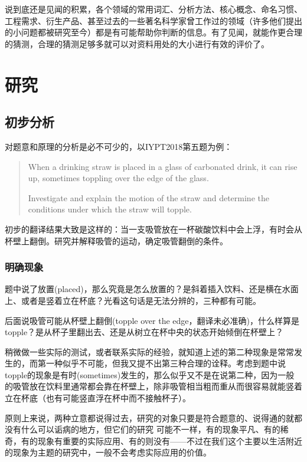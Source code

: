 \documentclass[a4paper,10pt,english]{sphinxmanual}
\begin{document}
说到底还是见闻的积累，各个领域的常用词汇、分析方法、核心概念、命名习惯、工程需求、衍生产品、甚至过去的一些著名科学家曾工作过的领域（许多他们提出的小问题都被研究至今）都是有可能帮助你判断的信息。有了见闻，就能作更合理的猜测，合理的猜测足够多就可以对资料用处的大小进行有效的评价了。


\chapter{研究}
\label{\detokenize{5. Research:id1}}\label{\detokenize{5. Research::doc}}

\section{初步分析}
\label{\detokenize{5. Research:id2}}
对题意和原理的分析是必不可少的，以IYPT2018第五题为例：
\begin{quote}

When a drinking straw is placed in a glass of carbonated drink, it can rise up, sometimes toppling over the edge of the glass.

Investigate and explain the motion of the straw and determine the conditions under which the straw will topple.
\end{quote}

初步的翻译结果大致是这样的：当一支吸管放在一杯碳酸饮料中会上浮，有时会从杯壁上翻倒。研究并解释吸管的运动，确定吸管翻倒的条件。


\subsection{明确现象}
\label{\detokenize{5. Research:id3}}
题中说了放置(placed)，那么究竟是怎么放置的？是斜着插入饮料、还是横在水面上、或者是竖着立在杯底？光看这句话是无法分辨的，三种都有可能。

后面说吸管可能从杯壁上翻倒(topple over the edge，翻译未必准确)，什么样算是topple？是从杯子里翻出去、还是从树立在杯中央的状态开始倾倒在杯壁上？

稍微做一些实际的测试，或者联系实际的经验，就知道上述的第二种现象是常常发生的，而第一种似乎不可能，但我又提不出第三种合理的诠释。考虑到题中说topple的现象是有时(sometimes)发生的，那么似乎又不是在说第二种，因为一般的吸管放在饮料里通常都会靠在杯壁上，除非吸管相当粗而重从而很容易就能竖着立在杯底（也有可能竖直浮在杯中而不接触杯子）。

原则上来说，两种立意都说得过去，研究的对象只要是符合题意的、说得通的就都没有什么可以诟病的地方，但它们的研究  可能不一样，有的现象平凡、有的稀奇，有的现象有重要的实际应用、有的则没有——不过在我们这个主要以生活附近的现象为主题的研究中，一般不会考虑实际应用的价值。
\end{document}
